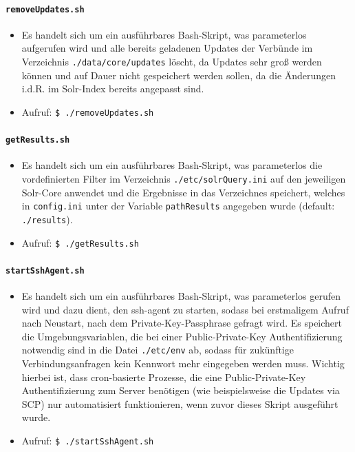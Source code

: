 \documentclass[10pt]{article}
\begin{document}
\paragraph{\texttt{removeUpdates.sh}}
\label{sec:para:removeUpdatesteCore}
\begin{itemize}
	\item Es handelt sich um ein ausführbares Bash-Skript, was parameterlos aufgerufen wird und alle bereits geladenen Updates der Verbünde im Verzeichnis \texttt{./data/core/updates} löscht, da Updates sehr groß werden können und auf Dauer nicht gespeichert werden sollen, da die Änderungen i.d.R. im Solr-Index bereits angepasst sind.
	\item Aufruf: \texttt{\$ ./removeUpdates.sh}
\end{itemize}

\paragraph{\texttt{getResults.sh}}
\label{sec:para:getResults}
\begin{itemize}
	\item Es handelt sich um ein ausführbares Bash-Skript, was parameterlos die vordefinierten Filter im Verzeichnis \texttt{./etc/solrQuery.ini} auf den jeweiligen Solr-Core anwendet und die Ergebnisse in das Verzeichnes speichert, welches in \texttt{config.ini} unter der Variable \texttt{pathResults} angegeben wurde (default: \texttt{./results}).
	\item Aufruf: \texttt{\$ ./getResults.sh}
\end{itemize}

\begin{minipage}{\linewidth}
\paragraph{\texttt{startSshAgent.sh}}
\label{sec:para:startSshAgent}
\begin{itemize}
	\item Es handelt sich um ein ausführbares Bash-Skript, was parameterlos gerufen wird und dazu dient, den ssh-agent zu starten, sodass bei erstmaligem Aufruf nach Neustart, nach dem Private-Key-Passphrase gefragt wird. Es speichert die Umgebungsvariablen, die bei einer Public-Private-Key Authentifizierung notwendig sind in die Datei \texttt{./etc/env} ab, sodass für zukünftige Verbindungsanfragen kein Kennwort mehr eingegeben werden muss. Wichtig hierbei ist, dass cron-basierte Prozesse, die eine Public-Private-Key Authentifizierung zum Server benötigen (wie beispielsweise die Updates via SCP) nur automatisiert funktionieren, wenn zuvor dieses Skript ausgeführt wurde.
	\item Aufruf: \texttt{\$ ./startSshAgent.sh} \\
\end{itemize}
\end{minipage}
\end{document}
